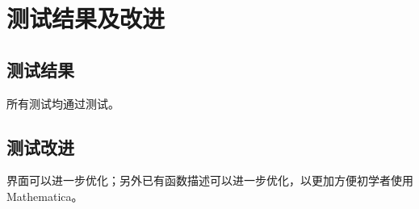 \documentclass[hyperref, UTF8
,bookmarksnumbered=true, oneside]{ctexbook}
\begin{document}
	

\chapter{测试结果及改进}

	\section{测试结果} %
	所有测试均通过测试。
	

	\section{测试改进} %
	界面可以进一步优化；另外已有函数描述可以进一步优化，以更加方便初学者使用Mathematica。
	
\end{document}
